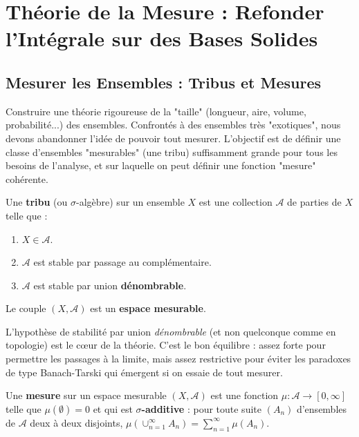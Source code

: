 \chapter{Théorie de la Mesure : Refonder l'Intégrale sur des Bases Solides}

\section{Mesurer les Ensembles : Tribus et Mesures}

\begin{objectif}
    Construire une théorie rigoureuse de la "taille" (longueur, aire, volume, probabilité...) des ensembles. Confrontés à des ensembles très "exotiques", nous devons abandonner l'idée de pouvoir tout mesurer. L'objectif est de définir une classe d'ensembles "mesurables" (une tribu) suffisamment grande pour tous les besoins de l'analyse, et sur laquelle on peut définir une fonction "mesure" cohérente.
\end{objectif}

\begin{definition}
    Une \textbf{tribu} (ou $\sigma$-algèbre) sur un ensemble $X$ est une collection $\mathcal{A}$ de parties de $X$ telle que :
    \begin{enumerate}
        \item $X \in \mathcal{A}$.
        \item $\mathcal{A}$ est stable par passage au complémentaire.
        \item $\mathcal{A}$ est stable par union \textbf{dénombrable}.
    \end{enumerate}
    Le couple $(X, \mathcal{A})$ est un \textbf{espace mesurable}.
\end{definition}
\begin{remark}
    L'hypothèse de stabilité par union \textit{dénombrable} (et non quelconque comme en topologie) est le cœur de la théorie. C'est le bon équilibre : assez forte pour permettre les passages à la limite, mais assez restrictive pour éviter les paradoxes de type Banach-Tarski qui émergent si on essaie de tout mesurer.
\end{remark}

\begin{definition}[Mesure]
    Une \textbf{mesure} sur un espace mesurable $(X, \mathcal{A})$ est une fonction $\mu: \mathcal{A} \to [0, \infty]$ telle que $\mu(\emptyset)=0$ et qui est \textbf{$\sigma$-additive} : pour toute suite $(A_n)$ d'ensembles de $\mathcal{A}$ deux à deux disjoints, $\mu(\cup_{n=1}^\infty A_n) = \sum_{n=1}^\infty \mu(A_n)$.
\end{definition}

